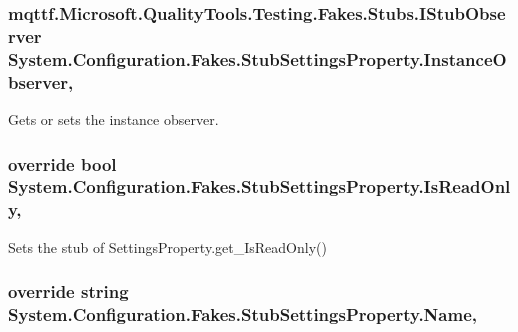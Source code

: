 \hypertarget{class_system_1_1_configuration_1_1_fakes_1_1_stub_settings_property_a58f9a3200e8bf6bdc33f313c5a1d5846}{
\subsubsection[{Instance\-Observer}]{\setlength{\rightskip}{0pt plus 5cm}mqttf.\-Microsoft.\-Quality\-Tools.\-Testing.\-Fakes.\-Stubs.\-I\-Stub\-Observer System.\-Configuration.\-Fakes.\-Stub\-Settings\-Property.\-Instance\-Observer\hspace{0.3cm}{\ttfamily [get]}, {\ttfamily [set]}}}\label{class_system_1_1_configuration_1_1_fakes_1_1_stub_settings_property_a58f9a3200e8bf6bdc33f313c5a1d5846}


Gets or sets the instance observer.

\hypertarget{class_system_1_1_configuration_1_1_fakes_1_1_stub_settings_property_a95fdf2722728c350f8582b316c0b0161}{
\subsubsection[{Is\-Read\-Only}]{\setlength{\rightskip}{0pt plus 5cm}override bool System.\-Configuration.\-Fakes.\-Stub\-Settings\-Property.\-Is\-Read\-Only\hspace{0.3cm}{\ttfamily [get]}, {\ttfamily [set]}}}\label{class_system_1_1_configuration_1_1_fakes_1_1_stub_settings_property_a95fdf2722728c350f8582b316c0b0161}


Sets the stub of Settings\-Property.\-get\-\_\-\-Is\-Read\-Only()

\hypertarget{class_system_1_1_configuration_1_1_fakes_1_1_stub_settings_property_a31dcb26e3a77e3537f321e53690045b1}{
\subsubsection[{Name}]{\setlength{\rightskip}{0pt plus 5cm}override string System.\-Configuration.\-Fakes.\-Stub\-Settings\-Property.\-Name\hspace{0.3cm}{\ttfamily [get]}, {\ttfamily [set]}}}\label{class_system_1_1_configuration_1_1_fakes_1_1_stub_settings_property_a31dcb26e3a77e3537f321e53690045b1}


